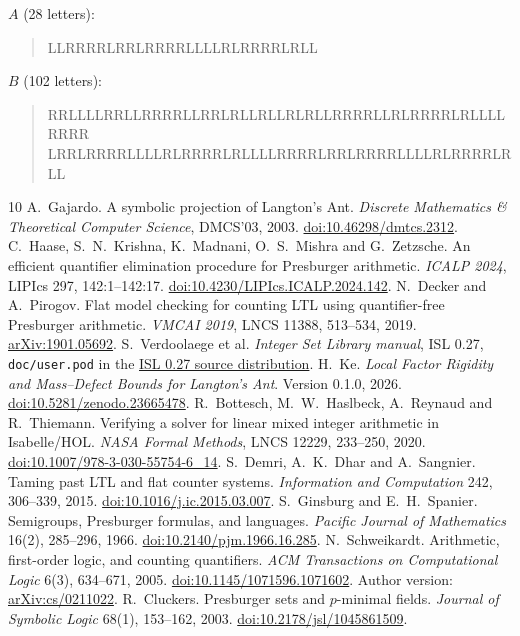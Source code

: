 \documentclass[11pt]{article}
\theoremstyle{remark}\newtheorem{remark}[theorem]{Remark}
\begin{document}
\noindent $A$ (28 letters):
\begin{quote}\ttfamily\small
LLRRRRLRRLRRRRLLLLRLRRRRLRLL
\end{quote}

\noindent $B$ (102 letters):
\begin{quote}\ttfamily\small
RRLLLLRRLLRRRRLLRRLRLLRLLRLRLLRRRRLLRLRRRRLRLLLLRRRR\\
LRRLRRRRLLLLRLRRRRLRLLLLRRRRLRRLRRRRLLLLRLRRRRLRLL
\end{quote}

\clearpage
\begingroup\small
\begin{thebibliography}{10}\setlength{\itemsep}{1pt}
 A.~Gajardo. A symbolic projection of Langton's Ant.
\emph{Discrete Mathematics \& Theoretical Computer Science}, DMCS'03, 2003.
\href{https://doi.org/10.46298/dmtcs.2312}{doi:10.46298/dmtcs.2312}.
 C.~Haase, S.~N.~Krishna, K.~Madnani, O.~S.~Mishra and
G.~Zetzsche. An efficient quantifier elimination procedure for Presburger
arithmetic. \emph{ICALP 2024}, LIPIcs 297, 142:1--142:17.
\href{https://doi.org/10.4230/LIPIcs.ICALP.2024.142}{doi:10.4230/LIPIcs.ICALP.2024.142}.
 N.~Decker and A.~Pirogov. Flat model checking for counting LTL
using quantifier-free Presburger arithmetic. \emph{VMCAI 2019},
LNCS 11388, 513--534, 2019.
\href{https://arxiv.org/abs/1901.05692}{arXiv:1901.05692}.
 S.~Verdoolaege et al. \emph{Integer Set Library manual},
ISL 0.27, \texttt{doc/user.pod} in the
\href{https://libisl.sourceforge.io/isl-0.27.tar.xz}{ISL 0.27 source distribution}.
 H.~Ke. \emph{Local Factor Rigidity and Mass--Defect Bounds
for Langton's Ant}. Version 0.1.0, 2026.
\href{https://doi.org/10.5281/zenodo.23665478}{doi:10.5281/zenodo.23665478}.
 R.~Bottesch, M.~W.~Haslbeck, A.~Reynaud and R.~Thiemann.
Verifying a solver for linear mixed integer arithmetic in Isabelle/HOL.
\emph{NASA Formal Methods}, LNCS 12229, 233--250, 2020.
\href{https://doi.org/10.1007/978-3-030-55754-6_14}{doi:10.1007/978-3-030-55754-6\_14}.
 S.~Demri, A.~K.~Dhar and A.~Sangnier.
Taming past LTL and flat counter systems.
\emph{Information and Computation} 242, 306--339, 2015.
\href{https://doi.org/10.1016/j.ic.2015.03.007}{doi:10.1016/j.ic.2015.03.007}.
 S.~Ginsburg and E.~H.~Spanier.
Semigroups, Presburger formulas, and languages.
\emph{Pacific Journal of Mathematics} 16(2), 285--296, 1966.
\href{https://doi.org/10.2140/pjm.1966.16.285}{doi:10.2140/pjm.1966.16.285}.
 N.~Schweikardt. Arithmetic, first-order logic, and counting
quantifiers. \emph{ACM Transactions on Computational Logic} 6(3), 634--671, 2005.
\href{https://doi.org/10.1145/1071596.1071602}{doi:10.1145/1071596.1071602}.
Author version: \href{https://arxiv.org/abs/cs/0211022}{arXiv:cs/0211022}.
 R.~Cluckers. Presburger sets and $p$-minimal fields.
\emph{Journal of Symbolic Logic} 68(1), 153--162, 2003.
\href{https://doi.org/10.2178/jsl/1045861509}{doi:10.2178/jsl/1045861509}.
\end{thebibliography}
\endgroup
\end{document}
